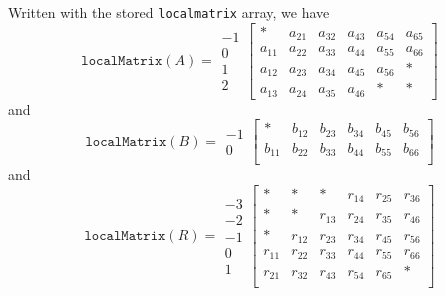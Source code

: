 Written with the stored \texttt{localmatrix} array, we have
\begin{displaymath}
  \mathtt{localMatrix}(A)=  \begin{array}{c}
    -1\\
    0\\
    1\\
    2
  \end{array}
\left[
  \begin{array}{ccc|ccc}
    *     & a_{21} & a_{32} & a_{43} & a_{54} & a_{65} \\
    a_{11} & a_{22} & a_{33} & a_{44} & a_{55} & a_{66} \\
    a_{12} & a_{23} & a_{34} & a_{45} & a_{56} & * \\
    a_{13} & a_{24} & a_{35} & a_{46} & *     & * 
  \end{array}
\right]
\end{displaymath}
and
\begin{displaymath}
  \mathtt{localMatrix}(B)=  \begin{array}{c}
    -1\\
    0
  \end{array}
\left[
  \begin{array}{ccc|ccc}
    *     & b_{12} & b_{23} & b_{34} & b_{45} & b_{56} \\ 
    b_{11} & b_{22} & b_{33} & b_{44} & b_{55} & b_{66} \\
  \end{array}
\right]
\end{displaymath}
and
\begin{displaymath}
  \mathtt{localMatrix}(R)=  \begin{array}{c}
    -3\\
    -2\\
    -1 \\
    0\\
    1
  \end{array}
\left[
  \begin{array}{ccc|ccc}
    *     & *      & *     & r_{14} & r_{25} & r_{36} \\ 
    *     & *      & r_{13} & r_{24} & r_{35} & r_{46} \\ 
    *     & r_{12} & r_{23} & r_{34} & r_{45} & r_{56} \\ 
    r_{11} & r_{22} & r_{33} & r_{44} & r_{55} & r_{66} \\
    r_{21} & r_{32} & r_{43} & r_{54} & r_{65} & * \\ 
  \end{array}
\right]
\end{displaymath}


